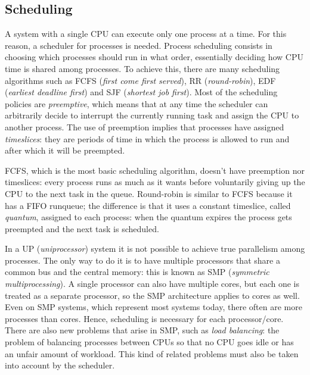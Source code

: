 \subsection{Scheduling} 
\label{sec:scheduling}
A system with a single CPU can execute only one process at a time. For this reason, a scheduler for processes is needed. Process scheduling consists in choosing which processes should run in what order, essentially deciding how CPU time is shared among processes. To achieve this, there are many scheduling algorithms such as FCFS (\textit{first come first served}), RR (\textit{round-robin}), EDF (\textit{earliest deadline first}) and SJF (\textit{shortest job first}). Most of the scheduling policies are \textit{preemptive}, which means that at any time the scheduler can arbitrarily decide to interrupt the currently running task and assign the CPU to another process. The use of preemption implies that processes have assigned \textit{timeslices}: they are periods of time in which the process is allowed to run and after which it will be preempted. 

FCFS, which is the most basic scheduling algorithm, doesn't have preemption nor timeslices: every process runs as much as it wants before voluntarily giving up the CPU to the next task in the queue. Round-robin is similar to FCFS because it has a FIFO runqueue; the difference is that it uses a constant timeslice, called \textit{quantum}, assigned to each process: when the quantum expires the process gets preempted and the next task is scheduled.

In a UP (\textit{uniprocessor}) system it is not possible to achieve true parallelism among processes. The only way to do it is to have multiple processors that share a common bus and the central memory: this is known as SMP (\textit{symmetric multiprocessing}). A single processor can also have multiple cores, but each one is treated as a separate processor, so the SMP architecture applies to cores as well. Even on SMP systems, which represent most systems today, there often are more processes than cores. Hence, scheduling is necessary for each processor/core. There are also new problems that arise in SMP, such as \textit{load balancing}: the problem of balancing processes between CPUs so that no CPU goes idle or has an unfair amount of workload. This kind of related problems must also be taken into account by the scheduler.

